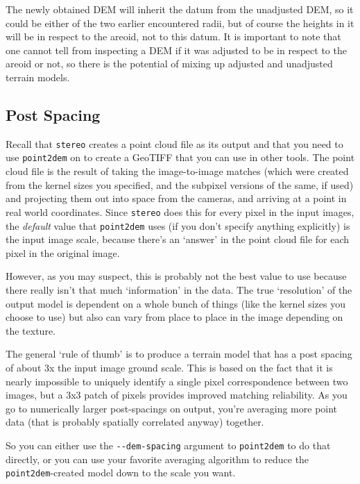 The newly obtained DEM will inherit the datum from the unadjusted DEM,
so it could be either of the two earlier encountered radii, but of
course the heights in it will be in respect to the areoid, not to this
datum. It is important to note that one cannot tell from inspecting a
DEM if it was adjusted to be in respect to the areoid or not, so there is
the potential of mixing up adjusted and unadjusted terrain models.

\subsection{Post Spacing}
\label{post-spacing}

Recall that \texttt{stereo} creates a point cloud file as its output
and that you need to use \texttt{point2dem} on to create a GeoTIFF that
you can use in other tools.  The point cloud file is the result of
taking the image-to-image matches (which were created from the
kernel sizes you specified, and the subpixel versions of the same,
if used) and projecting them out into space from the cameras, and
arriving at a point in real world coordinates.  Since \texttt{stereo} does
this for every pixel in the input images, the \emph{default} value that
\texttt{point2dem} uses (if you don't specify anything explicitly) is the
input image scale, because there's an `answer' in the point cloud
file for each pixel in the original image.

However, as you may suspect, this is probably not the best value to
use because there really isn't that much `information' in the data.
The true `resolution' of the output model is dependent on a whole
bunch of things (like the kernel sizes you choose to use) but also can
vary from place to place in the image depending on the texture.

The general `rule of thumb' is to produce a terrain model that has a
post spacing of about 3x the input image ground scale.  This is based
on the fact that it is nearly impossible to uniquely identify a single
pixel correspondence between two images, but a 3x3 patch of pixels
provides improved matching reliability.  As you go to numerically
larger post-spacings on output, you're averaging more point data (that
is probably spatially correlated anyway) together.

So you can either use the \texttt{-\/-dem-spacing} argument to
\texttt{point2dem} to do that directly, or you can use your
favorite averaging algorithm to reduce the \texttt{point2dem}-created
model down to the scale you want.

